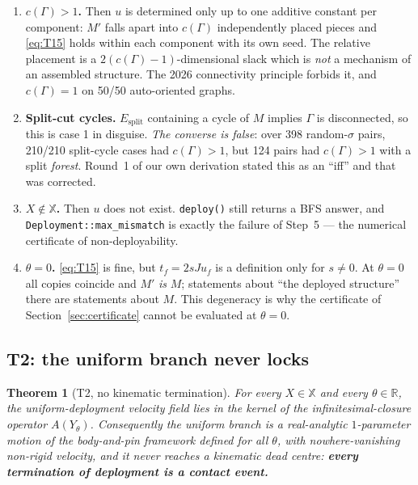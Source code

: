 \documentclass[11pt,a4paper]{article}
\newtheorem{theorem}{Theorem}[section]
\theoremstyle{definition}
\newcommand{\Esplit}{E_{\mathrm{split}}}
\newcommand{\Mprime}{M'}
\newcommand{\file}[1]{\texttt{\small #1}}
\begin{document}
\begin{enumerate}\itemsep2pt
\item \textbf{$c(\Gamma)>1$.} Then $u$ is determined only up to one additive constant per
component: $\Mprime$ falls apart into $c(\Gamma)$ independently placed pieces and
\eqref{eq:T15} holds within each component with its own seed. The relative placement is a
$2(c(\Gamma)-1)$-dimensional slack which is \emph{not} a mechanism of an assembled
structure. The 2026 connectivity principle forbids it, and $c(\Gamma)=1$ on 50/50
auto-oriented graphs.
\item \textbf{Split-cut cycles.} $\Esplit$ containing a cycle of $M$ implies $\Gamma$ is
disconnected, so this is case 1 in disguise. \emph{The converse is false}: over 398
random-$\sigma$ pairs, 210/210 split-cycle cases had $c(\Gamma)>1$, but 124 pairs had
$c(\Gamma)>1$ with a split \emph{forest}. Round~1 of our own derivation stated this as an
``iff'' and that was corrected.
\item \textbf{$X\notin\mathbb{X}$.} Then $u$ does not exist. \file{deploy()} still returns a
BFS answer, and \file{Deployment::max\_mismatch} is exactly the failure of Step~5 --- the
numerical certificate of non-deployability.
\item \textbf{$\theta=0$.} \eqref{eq:T15} is fine, but $t_f=2sJu_f$ is a definition only for
$s\ne0$. At $\theta=0$ all copies coincide and $\Mprime$ \emph{is} $M$; statements about
``the deployed structure'' there are statements about $M$. This degeneracy is why the
certificate of Section~\ref{sec:certificate} cannot be evaluated at $\theta=0$.
\end{enumerate}

\subsection{T2: the uniform branch never locks}

\begin{theorem}[T2, no kinematic termination]
\label{thm:t2}
For every $X\in\mathbb{X}$ and every $\theta\in\mathbb{R}$, the uniform-deployment velocity
field lies in the kernel of the infinitesimal-closure operator $A(Y_\theta)$. Consequently
the uniform branch is a real-analytic $1$-parameter motion of the body-and-pin framework
defined for all $\theta$, with nowhere-vanishing non-rigid velocity, and it never reaches a
kinematic dead centre: \textbf{every termination of deployment is a contact event.}
\end{theorem}
\end{document}
